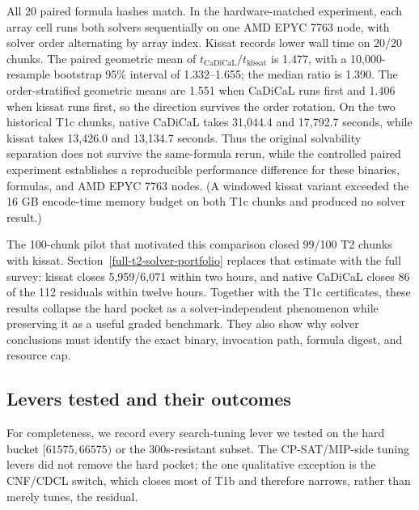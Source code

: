 All 20 paired formula hashes match. In the hardware-matched experiment, each
array cell runs both solvers sequentially on one AMD EPYC 7763 node, with
solver order alternating by array index. Kissat records lower wall time on
20/20 chunks. The paired geometric mean of
$t_{\mathrm{CaDiCaL}}/t_{\mathrm{kissat}}$ is 1.477, with a 10,000-resample
bootstrap 95\% interval of 1.332--1.655; the median ratio is 1.390. The
order-stratified geometric means are 1.551 when CaDiCaL runs first and 1.406
when kissat runs first, so the direction survives the order rotation. On the
two historical T1c chunks, native CaDiCaL takes 31,044.4 and 17,792.7
seconds, while kissat takes 13,426.0 and 13,134.7 seconds. Thus the original
solvability separation does not survive the same-formula rerun, while the
controlled paired experiment establishes a reproducible performance
difference for these binaries, formulas, and AMD EPYC 7763 nodes.
(A windowed kissat variant exceeded the 16 GB encode-time memory budget on
both T1c chunks and produced no solver result.)

The 100-chunk pilot that motivated this comparison closed 99/100 T2 chunks
with kissat. Section~\ref{full-t2-solver-portfolio} replaces that estimate
with the full survey: kissat closes 5,959/6,071 within two hours, and native
CaDiCaL closes 86 of the 112 residuals within twelve hours. Together with
the T1c certificates, these results collapse the hard pocket as a
solver-independent phenomenon while preserving it as a useful graded
benchmark. They also show why solver conclusions must identify the exact
binary, invocation path, formula digest, and resource cap.

\subsection{Levers tested and their outcomes}\label{levers-tested-and-their-outcomes}

For completeness, we record every search-tuning lever we tested on the hard
bucket $[61575, 66575)$ or the 300s-resistant subset. The CP-SAT/MIP-side
tuning levers did not remove the hard pocket; the one qualitative exception is
the CNF/CDCL switch, which closes most of T1b and therefore narrows, rather
than merely tunes, the residual.


